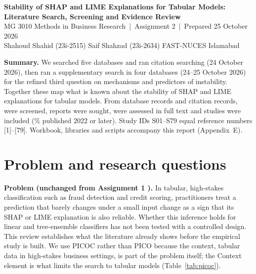 


\nocite{S01,S02,S03,S04,S05,S06,S07,S08,S09,S10,S11,S12,S13,S14,S15,S16,S17,S18,S19,S20,S21,S22,S23,S24,S25,S26,S27,S28,S29,S30,S31,S32,S33,S34,S35,S36,S37,S38,S39,S40,S41,S42,S43,S44,S45,S46,S47,S48,S49,S50,S51,S52,S53,S54,S55,S56,S57,S58,S59,S60,S61,S62,S63,S64,S65,S66,S67,S68,S69,S70,S71,S72,S73,S74,S75,S76,S77,S78,S79}

\begin{center}
{\Large\bfseries\color{navy} Stability of SHAP and LIME Explanations for Tabular Models:\\[2pt] Literature Search, Screening and Evidence Review}\\[6pt]
{\small MG 3010 Methods in Business Research \,|\, Assignment 2 \,|\, Prepared 25 October 2026}\\[3pt]
{\small Shahoud Shahid (23i-2515) \quad Saif Shahzad (23i-2634) \quad FAST-NUCES Islamabad}
\end{center}
\vspace{-4pt}
{\small\noindent\textbf{Summary.} We searched five databases and ran citation searching (24 October 2026), then ran a supplementary search in four databases (24--25 October 2026) for the refined third question on mechanisms and predictors of instability. Together these map what is known about the stability of SHAP and LIME explanations for tabular models. From \dbAllId{} database records and \csHarvested{} citation records, \totalScreened{} were screened, \totalSought{} reports were sought, \totalAssessed{} were assessed in full text and \totalIncluded{} studies were included (\pctSinceTwentyTwo\% published 2022 or later). Study IDs S01--S79 equal reference numbers [1]--[79]. Workbook, libraries and scripts accompany this report (Appendix~E).}

\section{Problem and research questions}
\textbf{Problem (unchanged from Assignment 1 \cite{a1proposal}).} In tabular, high-stakes classification such as fraud detection and credit scoring, practitioners treat a prediction that barely changes under a small input change as a sign that its SHAP \cite{lundberg2017} or LIME \cite{ribeiro2016} explanation is also reliable. Whether this inference holds for linear and tree-ensemble classifiers has not been tested with a controlled design. This review establishes what the literature already shows before the empirical study is built. We use PICOC rather than PICO because the context, tabular data in high-stakes business settings, is part of the problem itself; the Context element is what limits the search to tabular models (Table~\ref{tab:picoc}).


